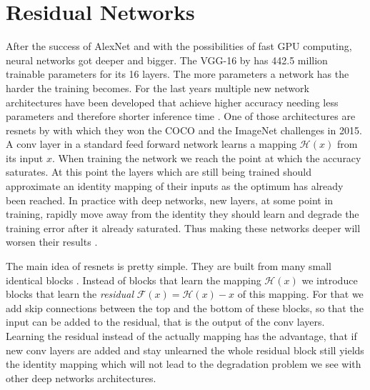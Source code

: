 \section{Residual Networks}
\label{sec:concepts:resnet}
After the success of AlexNet \citep{krizhevsky_imagenet_2012} and with the possibilities of fast GPU computing, neural networks got deeper and bigger.
The VGG-16 by \citet{simonyan_very_2014} has 442.5 million trainable parameters for its 16 layers. The more parameters a network has the harder the training becomes.
For the last years multiple new network architectures have been developed that achieve higher accuracy needing less parameters and therefore shorter inference time \citep{canziani_analysis_2016}. One of those architectures are \glspl{resnet} by \citet{he_deep_2016} with which they won the COCO  \citet{lin_microsoft_2014} and the ImageNet \citet{russakovsky_imagenet_2015}  challenges in 2015.
A \gls{conv} layer in a standard feed forward network learns a mapping $\mathcal{H}(x)$ from its input $x$. When training the network we reach the point at which the accuracy saturates. At this point the layers which are still being trained should approximate an identity mapping of their inputs as the optimum has already been reached. In practice with deep networks, new layers, at some point in training, rapidly move away from the identity they should learn and degrade the training error after it already saturated. Thus making these networks deeper will worsen their results \citep{he_convolutional_2015}.


The main idea of \glspl{resnet} is pretty simple. They are built from many small identical blocks . Instead of blocks that learn the mapping $\mathcal{H}(x)$ we introduce blocks that learn the \textit{residual} $\mathcal{F}(x) = \mathcal{H}(x) - x$ of this mapping. For that we add skip connections between the top and the bottom of these blocks, so that the input can be added to the residual, that is the output of the \gls{conv} layers. Learning the residual instead of the actually mapping has the advantage, that if new \gls{conv} layers are added and stay unlearned the whole residual block still yields the identity mapping which will not lead to the degradation problem we see with other deep networks architectures.

